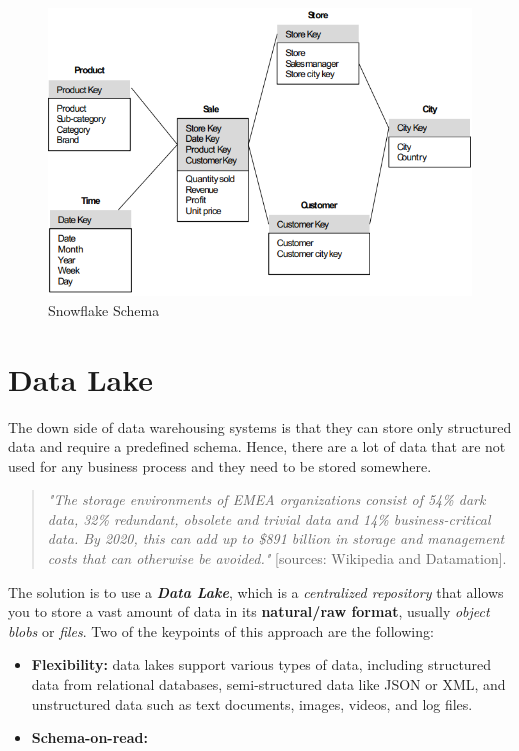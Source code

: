 \begin{figure}[ht!]
    \centering
    \includegraphics[scale=0.7]{images/DFM_snowflake_schema_2.png}
    \caption{Snowflake Schema}
    \label{figSnowflakeSchema}
\end{figure}

\section{Data Lake}

The down side of data warehousing systems is that they can store only structured data and require a predefined schema. Hence, there are a lot of data that are not used for any business process and they need to be stored somewhere.
\begin{quote}
    \textit{"The storage environments of EMEA organizations consist of 54\% dark data, 32\% redundant, obsolete and trivial data and 14\% business-critical data. By 2020, this can add up to \$891 billion in storage and management costs that can otherwise be avoided."} [sources: Wikipedia and Datamation].
\end{quote}

The solution is to use a \textit{\textbf{Data Lake}}, which is a \textit{centralized repository} that allows you to store a vast amount of data in its \textbf{natural/raw format}, usually \textit{object blobs} or \textit{files}. Two of the keypoints of this approach are the following:
\begin{itemize}
    \item \textbf{Flexibility:} data lakes support various types of data, including structured data from relational databases, semi-structured data like JSON or XML, and unstructured data such as text documents, images, videos, and log files.
    \item \textbf{Schema-on-read:} 
\end{itemize}